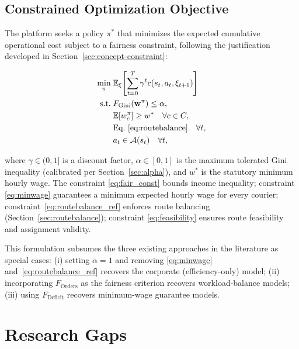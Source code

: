 \documentclass[12pt,a4paper]{report}
\begin{document}
\section{Constrained Optimization Objective}
\label{sec:objective}

The platform seeks a policy $\pi^*$ that minimizes the expected cumulative operational cost subject to a fairness constraint, following the justification developed in Section~\ref{sec:concept-constraint}:

\begin{align}
    \min_{\pi}\; & \mathbb{E}_{\xi}\!\left[\sum_{t=0}^{T} \gamma^t c(s_t, a_t, \xi_{t+1})\right]
    \label{eq:obj} \\
    \text{s.t.}\; & F_{\text{Gini}}(\mathbf{w}^\pi) \leq \alpha, \label{eq:fair_const}\\
    & \mathbb{E}[w_c^\pi] \geq w^* \quad \forall c \in C, \label{eq:minwage}\\
    & \text{Eq.}~\eqref{eq:routebalance} \quad \forall t, \label{eq:routebalance_ref} \\
    & a_t \in \mathcal{A}(s_t) \quad \forall t, \label{eq:feasibility}
\end{align}

\noindent where $\gamma \in (0,1]$ is a discount factor, $\alpha \in [0,1]$ is the maximum tolerated Gini inequality (calibrated per Section~\ref{sec:alpha}), and $w^*$ is the statutory minimum hourly wage. The constraint \eqref{eq:fair_const} bounds income inequality; constraint \eqref{eq:minwage} guarantees a minimum expected hourly wage for every courier; constraint~\eqref{eq:routebalance_ref} enforces route balancing (Section~\ref{sec:routebalance}); constraint \eqref{eq:feasibility} ensures route feasibility and assignment validity.

This formulation subsumes the three existing approaches in the literature as special cases: (i) setting $\alpha = 1$ and removing \eqref{eq:minwage} and~\eqref{eq:routebalance_ref} recovers the corporate (efficiency-only) model; (ii) incorporating $F_{\text{Orders}}$ as the fairness criterion recovers workload-balance models; (iii) using $F_{\text{Deficit}}$ recovers minimum-wage guarantee models.

\chapter{Research Gaps}
\label{ch:gaps}
\label{sec:gaps}
\end{document}
